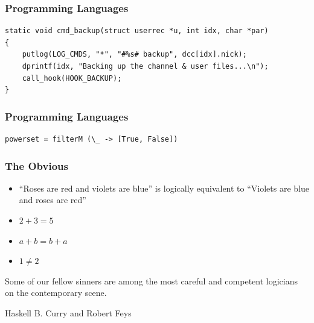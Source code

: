 \documentclass[aspectratio=169]{beamer}
\begin{document}
\begin{frame}[fragile]
	\frametitle{Programming Languages}
	\begin{verbatim}
static void cmd_backup(struct userrec *u, int idx, char *par)
{
	putlog(LOG_CMDS, "*", "#%s# backup", dcc[idx].nick);
	dprintf(idx, "Backing up the channel & user files...\n");
	call_hook(HOOK_BACKUP);
}
	\end{verbatim}
\end{frame}

\begin{frame}[fragile]
	\frametitle{Programming Languages}
	\begin{verbatim}
powerset = filterM (\_ -> [True, False])
	\end{verbatim}
\end{frame}
		
\begin{frame} 
		\frametitle{The Obvious}
		\begin{itemize}
			\item<2-> ``Roses are red and violets are blue'' is logically equivalent to ``Violets are blue and roses are red''
			\item<3-> $2 + 3 = 5$
			\item<4-> $a + b = b + a$ 
			\item<5-> $1 \neq 2$
		\end{itemize}
		\epigraph{Some of our fellow sinners are among the most careful and competent logicians on the contemporary scene.}{Haskell B. Curry and Robert Feys}
\end{frame}
\end{document}
